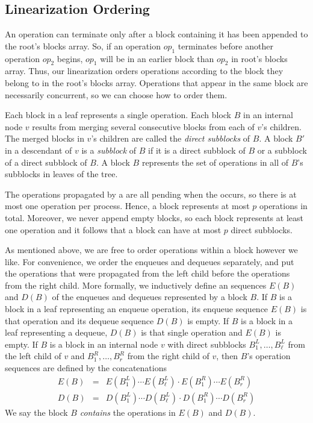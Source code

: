 \subsection{Linearization Ordering}

An operation can terminate only after a block containing it has been appended to the root's blocks array.
So, if an operation $op_1$ terminates before another operation $op_2$ begins, 
$op_1$ will be in an earlier block than $op_2$ in root's blocks array.
Thus, our linearization orders operations according to the block they belong to in the root's blocks array.
Operations that appear in the same block are necessarily concurrent, so we can choose how to order them.

Each block in a leaf represents a single operation.
Each block $B$ in an internal node $v$ results from merging
several consecutive blocks from each of $v$'s children.
The merged blocks in $v$'s children are called the \emph{direct subblocks} of $B$.
A block $B'$ in a descendant of $v$ is a \emph{subblock} of $B$ if it is a direct subblock of $B$
or a subblock of a direct subblock of $B$.
A block $B$ represents the set of operations in all of $B$'s subblocks in leaves of the tree.

The operations propagated by a  are all pending when the  occurs,
so there is at most one operation per process.
Hence, a block represents at most $p$ operations in total.  
Moreover, we never append empty blocks, so 
each block represents at least one operation and it follows that a block can have at most $p$ direct subblocks.

As mentioned above, we are free to order operations within a block however we like.
For convenience, we order the enqueues and dequeues separately, and put the 
operations that were propagated from the left child before the operations from the right child.
More formally, we inductively define an sequences $E(B)$ and $D(B)$ of the enqueues and dequeues
represented by a block $B$.
If $B$ is a block in a leaf representing an enqueue operation, its enqueue sequence $E(B)$ is that operation
and its dequeue sequence $D(B)$ is empty.  If $B$ is a block in a leaf representing a dequeue, $D(B)$ is that single operation and $E(B)$ is empty.
If $B$ is a block in an internal node $v$ with direct subblocks $B^L_1, \ldots, B^L_\ell$ from the left child of $v$
and $B^R_1,\ldots,B^R_r$ from the right child of $v$, then $B$'s operation sequences are defined by the concatenations 
\begin{eqnarray}
E(B) &=& E(B^L_1)\cdots E(B^L_\ell)\cdot E(B^R_1) \cdots E(B^R_r)\nonumber\\
D(B) &=& D(B^L_1)\cdots D(B^L_\ell)\cdot D(B^R_1) \cdots D(B^R_r)\label{defSeqs}
\end{eqnarray}
We say the block $B$ \emph{contains} the operations in $E(B)$ and $D(B)$.

